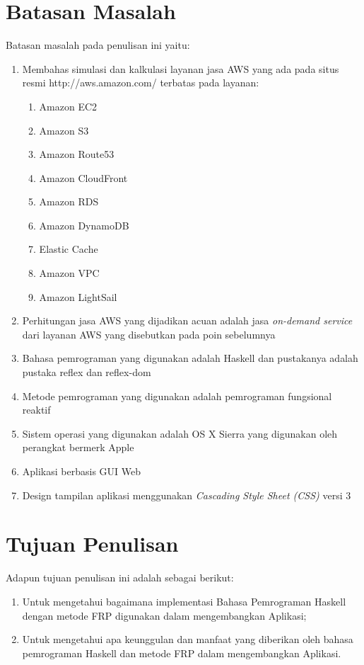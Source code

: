 \documentclass[pi.tex]{subfile}
\begin{document}
\section{Batasan Masalah}
Batasan masalah pada penulisan ini yaitu:
\begin{enumerate}[leftmargin=1.25cm]
  \item Membahas simulasi dan kalkulasi layanan jasa AWS yang ada pada situs resmi http://aws.amazon.com/ terbatas pada layanan:
    \begin{enumerate}[leftmargin=0.65cm]
      
    \item Amazon EC2
    \item Amazon S3
    \item Amazon Route53
    \item Amazon CloudFront
    \item Amazon RDS
    \item Amazon DynamoDB
    \item Elastic Cache
    \item Amazon VPC
    \item Amazon LightSail
      
    \end{enumerate}
    \item Perhitungan jasa AWS yang dijadikan acuan adalah jasa \emph{on-demand service} dari layanan AWS yang disebutkan pada poin sebelumnya
  \item Bahasa pemrograman yang digunakan adalah Haskell dan pustakanya adalah pustaka reflex dan reflex-dom
  \item Metode pemrograman yang digunakan adalah pemrograman fungsional reaktif
  \item Sistem operasi yang digunakan adalah OS X Sierra yang digunakan oleh perangkat bermerk Apple
  \item Aplikasi berbasis GUI Web
  \item Design tampilan aplikasi menggunakan \emph{Cascading Style Sheet (CSS)} versi 3
    
    
\end{enumerate}

\section{Tujuan Penulisan}
Adapun tujuan penulisan ini adalah sebagai berikut:
\begin{enumerate}[leftmargin=1.25cm]
  \item Untuk mengetahui bagaimana implementasi Bahasa Pemrograman Haskell dengan metode FRP digunakan dalam mengembangkan Aplikasi;
  \item Untuk mengetahui apa keunggulan dan manfaat yang diberikan oleh bahasa pemrograman Haskell dan metode FRP dalam mengembangkan Aplikasi.
\end{enumerate}
\end{document}
